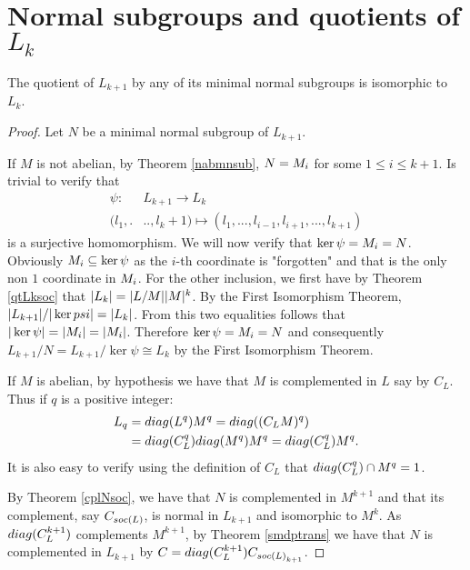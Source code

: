 \section{Normal subgroups and quotients of \texorpdfstring{$L_k$}{Lk}}

\begin{theorem}
    \label{S2:QLkmnsub}
    The quotient of $L_{k+1}$ by any of its minimal normal subgroups is isomorphic to $L_k$.
\end{theorem}

\begin{proof}
    Let $N$ be a minimal normal subgroup of $L_{k+1}$.

    If $M$ is not abelian, by Theorem \ref{nabmnsub}, $N = M_{i}$ for some $1 \le i \le k+1$. Is trivial to verify that
    \begin{align*}
        \psi \colon &L_{k+1} \longrightarrow L_k \\
                (l_1,.&..,l_k+1) \mapsto (l_1,...,l_{i-1},l_{i+1},...,l_{k+1})
    \end{align*}
    is a surjective homomorphism. We will now verify that $\ker \psi = M_{i} = N$. Obviously $M_{i} \subseteq \ker \psi$ as the $i$-th coordinate is "forgotten" and that is the only non $1$ coordinate in $M_{i}$. For the other inclusion, we first have by Theorem \ref{qtLksoc} that $| L_k | = | L/M | | M |^k$. By the First Isomorphism Theorem, $| L_{k+1} |/| \ker{psi} | = | L_k |$. From this two equalities follows that $| \ker \psi | = | M_{i} | = | M_{i} |$. Therefore $\ker \psi = M_{i} = N$ and consequently
    $L_{k+1}/N = L_{k+1}/\ker \psi \cong L_k$ by the First Isomorphism Theorem.

    If $M$ is abelian, by hypothesis we have that $M$ is complemented in $L$ say by $C_L$. Thus if $q$ is a positive integer:
    \begin{align*}
        L_q &= diag({L^q})M^q = diag({(C_LM)^q}) \\
                &= diag({C_L^q})diag({M^q})M^q = diag({C_L^q})M^q.
    \end{align*}
    It is also easy to verify using the definition of $C_L$ that $diag({C_L^q}) \cap M^q = 1$.

    By Theorem \ref{cplNsoc}, we have that $N$ is complemented in $M^{k+1}$ and that its complement, say $C_{soc {(L)}}$, is normal in $L_{k+1}$ and isomorphic to $M^{k}$. 
    As $diag({C_L^{k+1}})$ complements $M^{k+1}$, by Theorem \ref{smdptrans} we have that $N$ is complemented in $L_{k+1}$ by $C=diag({C_L^{k+1}})C_{soc {(L)}_{k+1}}$.


\end{proof}
